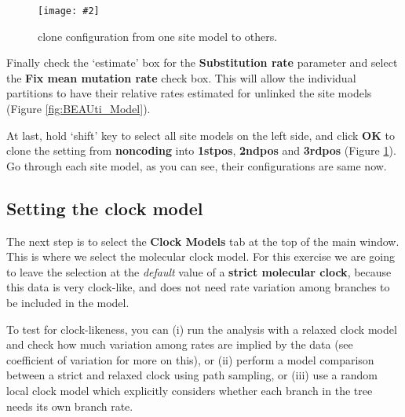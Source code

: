 \documentclass[11pt]{article}
\theoremstyle{plain}%
\theoremstyle{definition}
\theoremstyle{remark}
\newcommand{\includeimage}[2][]{%
\texttt{[image: \#2]}
}
\begin{document}
\begin{figure}
\centering	
\includeimage[width=0.9\textwidth]{figures/cloneFrom}
\label{fig:cloneFrom}
\caption{clone configuration from one site model to others.}
\end{figure}

Finally check the `estimate' box for the \textbf{Substitution rate} parameter and select the \textbf{Fix mean mutation rate} check box. This will allow the individual partitions to have their relative rates estimated for unlinked the site models (Figure \ref{fig:BEAUti_Model}).


At last, hold `shift' key to select all site models on the left side, and click \textbf{OK} to clone the setting from \textbf{noncoding} into \textbf{1stpos}, \textbf{2ndpos} and \textbf{3rdpos} (Figure \ref{fig:cloneFrom}). Go through each site model, as you can see, their configurations are same now. 


\subsection{Setting the clock model}

The next step is to select the {\bf Clock Models} tab at the top of the
main window. This is where we select the molecular clock model. For this exercise we are going to leave the selection at the {\it default} value of a \textbf{strict molecular clock}, because this data is very clock-like, and does not need rate variation among branches to be included in the model.

To test for clock-likeness, you can (i) run the analysis with
a relaxed clock model and check how much variation among rates are implied
by the data (see coefficient of variation for more on this), or
(ii) perform a model comparison between a strict and relaxed clock using path
sampling, or (iii) use a random local clock model \cite{drummond2010bayesian}
which explicitly considers whether each branch in the tree needs its own branch
rate.

\end{document}
